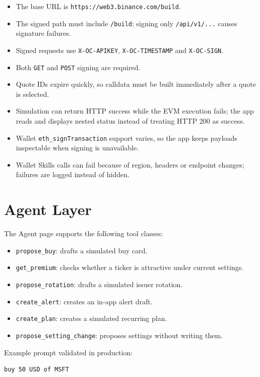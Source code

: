 \documentclass[11pt,a4paper]{article}
\begin{document}
\begin{itemize}
  \item The base URL is \texttt{https://web3.binance.com/build}.
  \item The signed path must include \texttt{/build}; signing only \texttt{/api/v1/...} causes signature failures.
  \item Signed requests use \texttt{X-OC-APIKEY}, \texttt{X-OC-TIMESTAMP} and \texttt{X-OC-SIGN}.
  \item Both \texttt{GET} and \texttt{POST} signing are required.
  \item Quote IDs expire quickly, so calldata must be built immediately after a quote is selected.
  \item Simulation can return HTTP success while the EVM execution fails; the app reads and displays nested status instead of treating HTTP 200 as success.
  \item Wallet \texttt{eth\_signTransaction} support varies, so the app keeps payloads inspectable when signing is unavailable.
  \item Wallet Skills calls can fail because of region, headers or endpoint changes; failures are logged instead of hidden.
\end{itemize}

\section{Agent Layer}

The Agent page supports the following tool classes:

\begin{itemize}
  \item \texttt{propose\_buy}: drafts a simulated buy card.
  \item \texttt{get\_premium}: checks whether a ticker is attractive under current settings.
  \item \texttt{propose\_rotation}: drafts a simulated issuer rotation.
  \item \texttt{create\_alert}: creates an in-app alert draft.
  \item \texttt{create\_plan}: creates a simulated recurring plan.
  \item \texttt{propose\_setting\_change}: proposes settings without writing them.
\end{itemize}

Example prompt validated in production:

\begin{verbatim}
buy 50 USD of MSFT
\end{verbatim}
\end{document}
